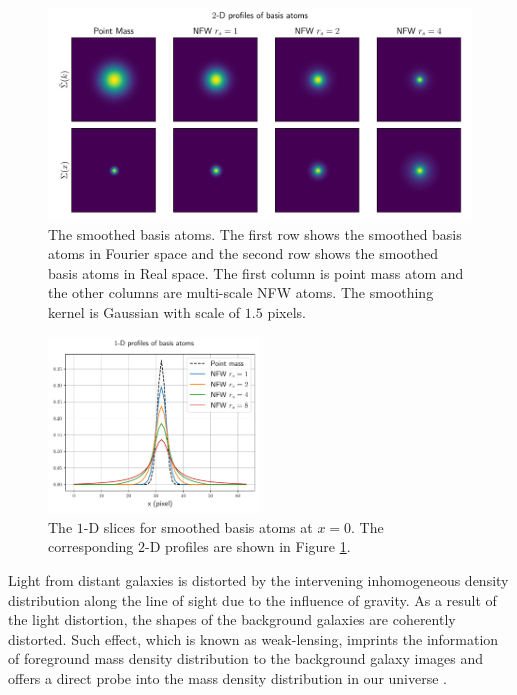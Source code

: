 \documentclass[twocolumn]{aastex62}
\begin{document}
\begin{figure}[!t]
    \includegraphics[width=1.\textwidth]{nfwlet-atom-2D.pdf}
    \caption{The smoothed basis atoms. The first row shows the smoothed basis atoms in Fourier space
            and the second row shows the smoothed basis atoms in Real space.
            The first column is point mass atom and the other columns are multi-scale NFW atoms.
            The smoothing kernel is Gaussian with scale of $1.5$ pixels.} \label{fig-atoms2D}
\end{figure}

\begin{figure}
 \includegraphics[width=0.5\textwidth]{nfwlet-atom-1D.pdf}
 \caption{The $1$-D slices for smoothed basis atoms at $x=0$. The corresponding $2$-D profiles are shown in Figure
        \ref{fig-atoms2D}.} \label{fig-atoms1D}
\end{figure}

Light from distant galaxies is distorted by the intervening inhomogeneous density distribution along the line of sight
due to the influence of gravity. As a result of the light distortion, the shapes of the background galaxies are coherently
distorted. Such effect, which is known as weak-lensing, imprints the information of foreground mass density distribution
to the background galaxy images and offers a direct probe into the mass density distribution in our universe
\citep[see][for recent reviews]{revKilbinger15,revRachel17}.
\end{document}
